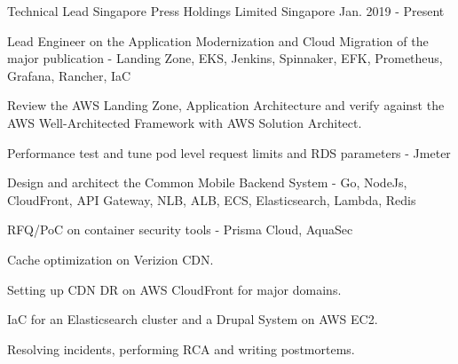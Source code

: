 

\begin{cventries}


  \cventry
      {Technical Lead} %
      {Singapore Press Holdings Limited} %
      {Singapore} %
      {Jan. 2019 - Present} %
      { %
        \begin{cvitems}
          \item {Lead Engineer on the Application Modernization and Cloud Migration of the major publication - Landing Zone, EKS, Jenkins, Spinnaker, EFK, Prometheus, Grafana, Rancher, IaC}
          \item {Review the AWS Landing Zone, Application Architecture and verify against the AWS Well-Architected Framework with AWS Solution Architect.}\newline
          \item {Performance test and tune pod level request limits and RDS parameters - Jmeter}
          \item {Design and architect the Common Mobile Backend System - Go, NodeJs, CloudFront, API Gateway, NLB, ALB, ECS, Elasticsearch, Lambda, Redis}
          \item {RFQ/PoC on container security tools - Prisma Cloud, AquaSec}
          \item {Cache optimization on Verizion CDN.}
          \item {Setting up CDN DR on AWS CloudFront for major domains.}
          \item {IaC for an Elasticsearch cluster and a Drupal System on AWS EC2.}
          \item {Resolving incidents, performing RCA and writing postmortems.}
        \end{cvitems}
      }



\end{cventries}
